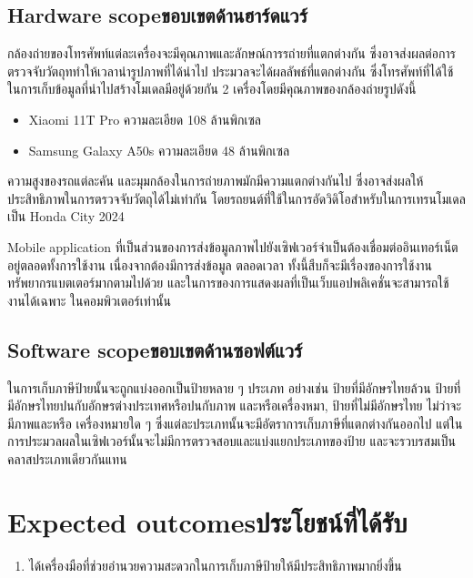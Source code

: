 \subsection{\ifenglish Hardware scope\else ขอบเขตด้านฮาร์ดแวร์\fi}

กล้องถ่ายของโทรศัพท์แต่ละเครื่องจะมีคุณภาพและลักษณ์การรถ่ายที่แตกต่างกัน ซึ่งอาจส่งผลต่อการตรวจจับวัตถุททำให้เวลานำรูปภาพที่ได้นำไป
ประมวลจะได้ผลลัพธ์ที่แตกต่างกัน ซึ่งโทรศัพท์ที่ได้ใช้ในการเก็บข้อมูลที่นำไปสร้างโมเดลมีอยู่ด้วยกัน 2 เครื่องโดยมีคุณภาพของกล้องถ่ายรูปดังนี้
\begin{itemize}
    \item Xiaomi 11T Pro ความละเอียด 108 ล้านพิกเซล 
    \item Samsung Galaxy A50s ความละเอียด 48 ล้านพิกเซล 
\end{itemize}

ความสูงของรถแต่ละคัน และมุมกล้องในการถ่ายภาพมักมีความแตกต่างกันไป ซึ่งอาจส่งผลให้ประสิทธิภาพในการตรวจจับวัตถุได้ไม่เท่ากัน 
โดยรถยนต์ที่ใช้ในการอัดวิดิโอสำหรับในการเทรนโมเดลเป็น Honda City 2024 

Mobile application ที่เป็นส่วนของการส่งข้อมูลภาพไปยังเซิฟเวอร์จำเป็นต้องเชื่อมต่ออินเทอร์เน็ตอยู่ตลอดทั้งการใช้งาน เนื่องจากต้องมีการส่งข้อมูล
ตลอดเวลา ทั้งนี้สืบก็จะมีเรื่องของการใช้งานทรัพยากรแบตเตอร์มากตามไปด้วย และในการของการแสดงผลที่เป็นเว็บแอปพลิเคชั่นจะสามารถใช้งานได้เฉพาะ
ในคอมพิวเตอร์เท่านั้น 

\subsection{\ifenglish Software scope\else ขอบเขตด้านซอฟต์แวร์\fi}

ในการเก็บภาษีป้ายนั้นจะถูกแบ่งออกเป็นป้ายหลาย ๆ ประเภท อย่างเช่น ป้ายที่มีอักษรไทยล้วน ป้ายที่มีอักษรไทยปนกับอักษรต่างประเทศหรือปนกับภาพ 
และหรือเครื่องหมา, ป้ายที่ไม่มีอักษรไทย ไม่ว่าจะมีภาพและหรือ เครื่องหมายใด ๆ ซึ่งแต่ละประเภทนั้นจะมีอัตราการเก็บภาษีที่แตกต่างกันออกไป 
แต่ในการประมวลผลในเซิฟเวอร์นั้นจะไม่มีการตรวจสอบและแบ่งแยกประเภทของป้าย และจะรวบรสมเป็นคลาสประเภทเดียวกันแทน 

\section{\ifenglish Expected outcomes\else ประโยชน์ที่ได้รับ\fi}
\begin{enumerate}
    \item ได้เครื่องมือที่ช่วยอำนวยความสะดวกในการเก็บภาษีป้ายให้มีประสิทธิภาพมากยิ่งขึ้น
\end{enumerate}

